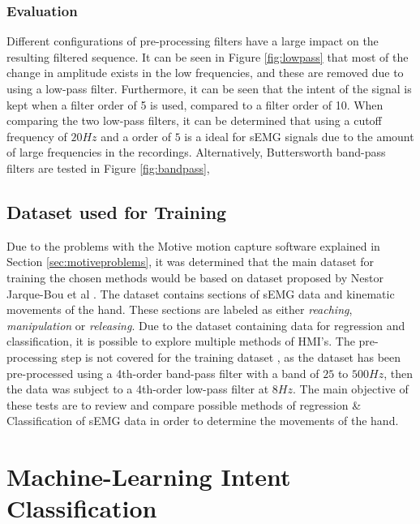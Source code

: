 \documentclass[../main.tex]{subfiles}
\begin{document}
\subsubsection{Evaluation}

Different configurations of pre-processing filters have a large impact on the resulting filtered sequence. 
It can be seen in Figure \ref{fig:lowpass} that most of the change in amplitude exists in the low frequencies, and these are removed due to using a low-pass filter.
Furthermore, it can be seen that the intent of the signal is kept when a filter order of 5 is used, compared to a filter order of 10.
When comparing the two low-pass filters, it can be determined that using a cutoff frequency of $20Hz$ and a order of $5$ is a ideal for sEMG signals due to the amount of large frequencies in the recordings.
Alternatively, Buttersworth band-pass filters are tested in Figure \ref{fig:bandpass},

\subsection{Dataset used for Training}

Due to the problems with the Motive motion capture software explained in Section \ref{sec:motiveproblems}, it was determined that the main dataset for training the chosen methods would be based on dataset \cite{kinmusdataset} proposed by Nestor Jarque-Bou et al \cite{jarque2019}.
The dataset contains sections of sEMG data and kinematic movements of the hand.
These sections are labeled as either \textit{reaching}, \textit{manipulation} or \textit{releasing}.  
Due to the dataset containing data for regression and classification, it is possible to explore multiple methods of HMI's. 
The pre-processing step is not covered for the training dataset \cite{kinmusdataset}, as the dataset has been pre-processed using a 4th-order band-pass filter with a band of  $25$ to $500Hz$, then the data was subject to a 4th-order low-pass filter at $8 Hz$.
The main objective of these tests are to review and compare possible methods of regression \& Classification of sEMG data in order to determine the movements of the hand.

\section{Machine-Learning Intent Classification}
\label{sec:machine-learning}
\end{document}
